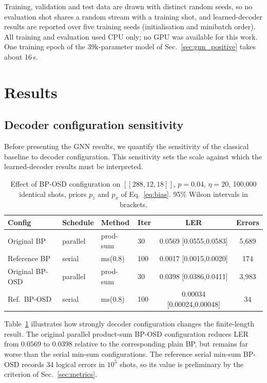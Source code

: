 \documentclass[a4paper,twocolumn,11pt,nopdfoutputerror]{quantumarticle}
\newcommand{\code}[3]{\ensuremath{[\![#1,#2,#3]\!]}}
\begin{document}
Training, validation and test data are drawn with distinct random
seeds, so no evaluation shot shares a random stream with a training
shot, and learned-decoder results are reported over five training seeds
(initialisation and minibatch order). All training and evaluation used
CPU only; no GPU was available for this work. One training epoch of the
39k-parameter model of Sec.~\ref{sec:gnn_positive} takes about 16\,s.

\section{Results}\label{sec:results}

\subsection{Decoder configuration sensitivity}\label{sec:baseline}

Before presenting the GNN results, we quantify the sensitivity of the
classical baseline to decoder configuration. This sensitivity sets the
scale against which the learned-decoder results must be interpreted.

\begin{table}[t]
\centering
\caption{Effect of BP-OSD configuration on $\code{288}{12}{18}$,
         $p=0.04$, $\eta=20$, 100{,}000 identical shots, priors $p_z$ and
         $p_x$ of Eq.~\eqref{eq:bias}. 95\% Wilson intervals in brackets.}
\label{tab:smoking_gun}
\begin{tabular}{@{}llllcc@{}}
\toprule
Config & Schedule & Method & Iter & LER & Errors \\
\midrule
Original BP & parallel & prod-sum & 30 & 0.0569 [0.0555,0.0583] & 5{,}689 \\
Reference BP & serial & ms(0.8) & 100 & 0.0017 [0.0015,0.0020] & 174 \\
Original BP-OSD & parallel & prod-sum & 30 & 0.0398 [0.0386,0.0411] & 3{,}983 \\
Ref.\ BP-OSD & serial & ms(0.8) & 100 & 0.00034 [0.00024,0.00048] & 34 \\
\bottomrule
\end{tabular}
\end{table}

Table~\ref{tab:smoking_gun} illustrates how strongly decoder
configuration changes the finite-length result. The original parallel
product-sum BP-OSD configuration reduces LER from $0.0569$ to $0.0398$
relative to the corresponding plain BP, but remains far worse than the
serial min-sum configurations. The reference serial min-sum BP-OSD
records 34 logical errors in $10^5$ shots, so its value is preliminary
by the criterion of Sec.~\ref{sec:metrics}.
\end{document}
